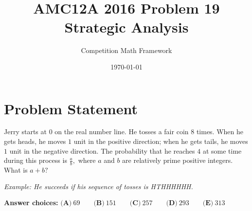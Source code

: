 \documentclass[]{article}
\begin{document}
\title{AMC12A 2016 Problem 19 Strategic Analysis}
\author{Competition Math Framework}
\date{\today}
\maketitle

\section*{Problem Statement}
Jerry starts at $0$ on the real number line. He tosses a fair coin $8$ times. When he gets heads, he moves $1$ unit in the positive direction; when he gets tails, he moves $1$ unit in the negative direction. The probability that he reaches $4$ at some time during this process is $\frac{a}{b},$ where $a$ and $b$ are relatively prime positive integers. What is $a + b?$

\textit{Example: He succeeds if his sequence of tosses is HTHHHHHH.}

\textbf{Answer choices:} $\textbf{(A)}\ 69\qquad\textbf{(B)}\ 151\qquad\textbf{(C)}\ 257\qquad\textbf{(D)}\ 293\qquad\textbf{(E)}\ 313$
\end{document}
